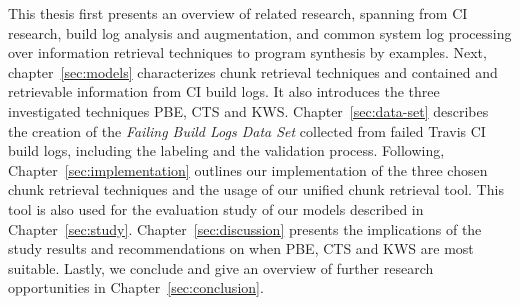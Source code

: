 \documentclass[\myrootdir/main.tex]{subfiles}
\begin{document}
This thesis first presents an overview of related research, spanning from CI research, build log analysis and augmentation, and common system log processing over information retrieval techniques to program synthesis by examples.
Next, chapter~\ref{sec:models} characterizes chunk retrieval techniques and contained and retrievable information from CI build logs.
It also introduces the three investigated techniques PBE, CTS and KWS.
Chapter~\ref{sec:data-set} describes the creation of the \emph{Failing Build Logs Data Set} collected from failed Travis CI build logs, including the labeling and the validation process.
Following, Chapter~\ref{sec:implementation} outlines our implementation of the three chosen chunk retrieval techniques and the usage of our unified chunk retrieval tool.
This tool is also used for the evaluation study of our models described in Chapter~\ref{sec:study}.
Chapter~\ref{sec:discussion} presents the implications of the study results and recommendations on when PBE, CTS and KWS are most suitable.
Lastly, we conclude and give an overview of further research opportunities in Chapter~\ref{sec:conclusion}.
\end{document}
